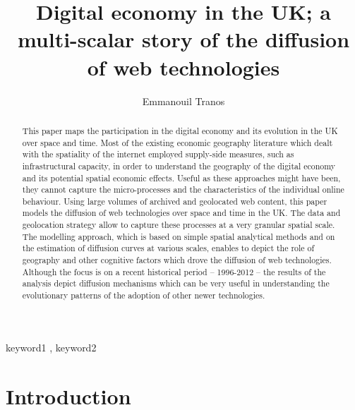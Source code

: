 \documentclass[preprint, 3p,
authoryear]{elsarticle} %
\begin{document}
\begin{frontmatter}

  \title{Digital economy in the UK; a multi-scalar story of the
diffusion of web technologies}
    \author[University of Bristol and The Alan Turing
Institute]{Emmanouil Tranos%
  }
  
  \begin{abstract}
  This paper maps the participation in the digital economy and its
  evolution in the UK over space and time. Most of the existing economic
  geography literature which dealt with the spatiality of the internet
  employed supply-side measures, such as infrastructural capacity, in
  order to understand the geography of the digital economy and its
  potential spatial economic effects. Useful as these approaches might
  have been, they cannot capture the micro-processes and the
  characteristics of the individual online behaviour. Using large
  volumes of archived and geolocated web content, this paper models the
  diffusion of web technologies over space and time in the UK. The data
  and geolocation strategy allow to capture these processes at a very
  granular spatial scale. The modelling approach, which is based on
  simple spatial analytical methods and on the estimation of diffusion
  curves at various scales, enables to depict the role of geography and
  other cognitive factors which drove the diffusion of web technologies.
  Although the focus is on a recent historical period -- 1996-2012 --
  the results of the analysis depict diffusion mechanisms which can be
  very useful in understanding the evolutionary patterns of the adoption
  of other newer technologies.
  \end{abstract}
    \begin{keyword}
    keyword1 \sep 
    keyword2
  \end{keyword}
  
 \end{frontmatter}

\hypertarget{sec:1}{%
\section{Introduction}\label{sec:1}}
\end{document}
